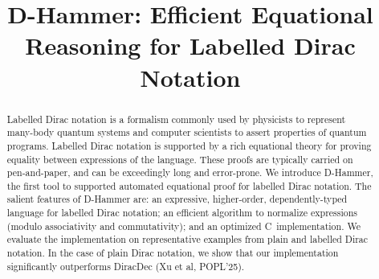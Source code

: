 \documentclass[runningheads]{llncs}
\newcommand{\CC}{C\nolinebreak\hspace{-.05em}\raisebox{.4ex}{\tiny\bf +}\nolinebreak\hspace{-.10em}\raisebox{.4ex}{\tiny\bf +}}
\def\CC{{C\nolinebreak[4]\hspace{-.05em}\raisebox{.4ex}{\tiny\bf ++}}}
\begin{document}
%
\title{D-Hammer: Efficient Equational Reasoning for Labelled Dirac Notation}
\author{}
\institute{}



%
\maketitle              %
%
\begin{abstract}
Labelled Dirac notation is a formalism commonly used by physicists to
represent many-body quantum systems and computer scientists to assert
properties of quantum programs. Labelled Dirac notation is supported
by a rich equational theory for proving equality between expressions
of the language. These proofs are typically carried on pen-and-paper,
and can be exceedingly long and error-prone. We introduce D-Hammer,
the first tool to supported automated equational proof for labelled
Dirac notation. The salient features of D-Hammer are: an expressive,
higher-order, dependently-typed language for labelled Dirac notation;
an efficient algorithm to normalize expressions (modulo associativity
and commutativity); and an optimized \CC\ implementation. We evaluate
the implementation on representative examples from plain and labelled
Dirac notation. In the case of plain Dirac notation, we show that our
implementation significantly outperforms DiracDec (Xu et al, POPL'25).
  


\end{abstract}
%
%
%
\end{document}
